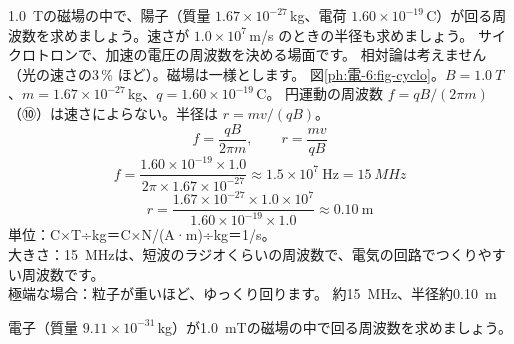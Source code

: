 \label{ph:電-6:ex9}
\begin{phreidai}[サイクロトロンの周波数]
\qty{1.0}{T}の磁場の中で、陽子（質量 $1.67\times10^{-27}$\,kg、電荷 $1.60\times10^{-19}$\,C）が回る周波数を求めましょう。速さが $1.0\times10^7$\,m/s のときの半径も求めましょう。
\phbamen
サイクロトロンで、加速の電圧の周波数を決める場面です。
\phmushi
相対論は考えません（光の速さの3\,\% ほど）。磁場は一様とします。
\phzu
図\ref{ph:電-6:fig-cyclo}。$B=\qty{1.0}{T}$、$m=1.67\times10^{-27}$\,kg、$q=1.60\times10^{-19}$\,C。
\phriyu
円運動の周波数 $f=qB/(2\pi m)$（⑩）は速さによらない。半径は $r=mv/(qB)$。
\phtateru
\[f=\frac{qB}{2\pi m},\qquad r=\frac{mv}{qB}\]
\phtoku
\[f=\frac{1.60\times10^{-19}\times1.0}{2\pi\times1.67\times10^{-27}}\approx1.5\times10^7\ \text{Hz}=\qty{15}{MHz}\]
\[r=\frac{1.67\times10^{-27}\times1.0\times10^7}{1.60\times10^{-19}\times1.0}\approx0.10\ \text{m}\]
\phtashikame
単位：C×T÷kg＝C×N/(A·m)÷kg＝1/s。\\
大きさ：\qty{15}{MHz}は、短波のラジオくらいの周波数で、電気の回路でつくりやすい周波数です。\\
極端な場合：粒子が重いほど、ゆっくり回ります。
\kotae 約\qty{15}{MHz}、半径約\qty{0.10}{m}
\end{phreidai}
\begin{jibun}
電子（質量 $9.11\times10^{-31}$\,kg）が\qty{1.0}{mT}の磁場の中で回る周波数を求めましょう。
\end{jibun}

